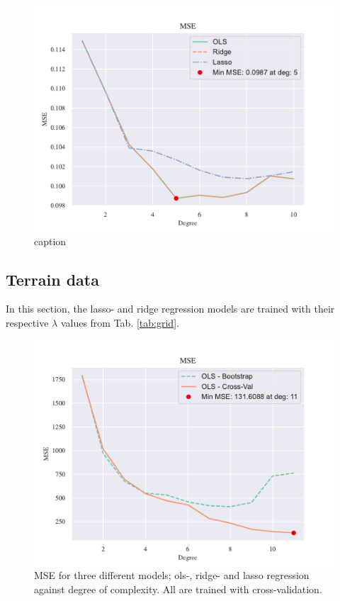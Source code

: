 \begin{figure}[h!]
    \centering
    \includegraphics[width=1\linewidth]{project_1_alt/figures/figures_in_report/OLS_Ridge_Lasso_Franke_Noise.pdf}
    \caption{caption}
    \label{all3franke}
\end{figure}


\subsection{Terrain data}

In this section, the lasso- and ridge regression models are trained with their respective $\lambda$ values from Tab. \ref{tab:grid}. 

\begin{figure}[h!]
    \centering
    \includegraphics[width=1\linewidth]{project_1_alt/figures/figures_in_report/CV_BS_OLS_Terrain.pdf}
    \caption{MSE for three different models; ols-, ridge- and lasso regression against degree of complexity. All are trained with cross-validation.}
    \label{cv_versus_bs}
\end{figure}

